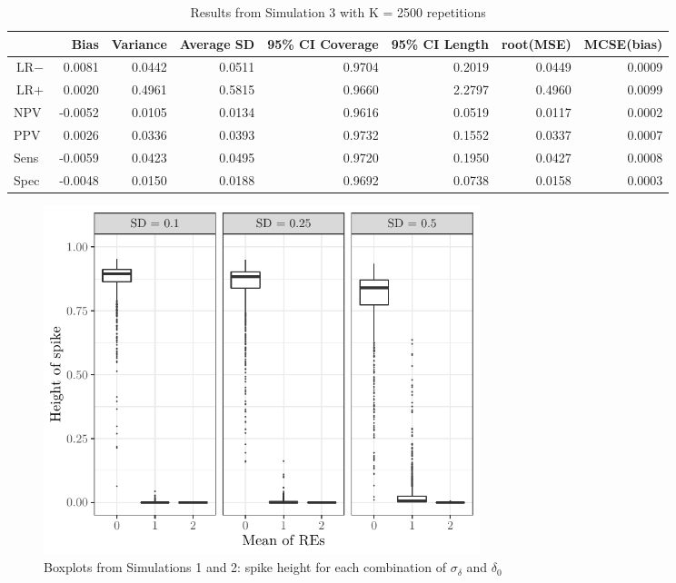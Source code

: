 \documentclass[AMA,STIX1COL]{WileyNJD-v2}
\begin{document}
\begin{table}[ht]
\centering
\begin{tabular}{lrrrrrrr}
  \hline
 & Bias & Variance & Average SD & 95\% CI Coverage & 95\% CI Length & root(MSE) & MCSE(bias) \\ 
  \hline
$\mbox{LR}-$ & 0.0081 & 0.0442 & 0.0511 & 0.9704 & 0.2019 & 0.0449 & 0.0009 \\ 
  $\mbox{LR}+$ & 0.0020 & 0.4961 & 0.5815 & 0.9660 & 2.2797 & 0.4960 & 0.0099 \\ 
  NPV & -0.0052 & 0.0105 & 0.0134 & 0.9616 & 0.0519 & 0.0117 & 0.0002 \\ 
  PPV & 0.0026 & 0.0336 & 0.0393 & 0.9732 & 0.1552 & 0.0337 & 0.0007 \\ 
  Sens & -0.0059 & 0.0423 & 0.0495 & 0.9720 & 0.1950 & 0.0427 & 0.0008 \\ 
  Spec & -0.0048 & 0.0150 & 0.0188 & 0.9692 & 0.0738 & 0.0158 & 0.0003 \\ 
   \hline
\end{tabular}
\caption{Results from Simulation 3 with K = 2500 repetitions} 
\label{table:CTSs}
\end{table}



\begin{figure}
\includegraphics[height = 4in, width = 5in]{spike_boxplot.pdf}
\caption{Boxplots from Simulations 1 and 2: spike height for each combination of $\sigma_\delta$ and $\delta_0$}
\label{fig:SSP-boxplot}
\end{figure}
\end{document}
